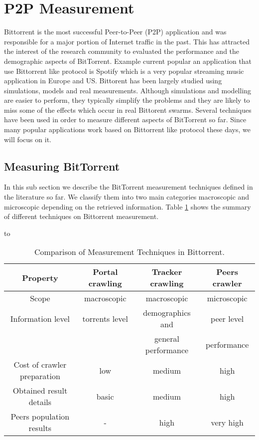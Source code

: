 \section{P2P Measurement}

Bittorrent is the most successful Peer-to-Peer (P2P) application and was responsible for a major portion of Internet traffic in the past.
This has attracted the interest of the research community to evaluated the performance and the demographic aspects of BitTorrent.
Example current popular an application that use Bittorrent like protocol is Spotify which is a very popular streaming music application in Europe and US.
Bittorent has been largely studied using simulations, models and real measurements. 
Although simulations and modelling are easier to perform, they typically simplify the problems and they are likely to miss some of the effects which occur in real Bittorent swarms. 
Several techniques have been used in order to measure different aspects of BitTorrent so far. 
Since many popular applications work based on Bittorrent like protocol these days, we will focus on it.

\subsection{Measuring BitTorrent}
In this sub section we describe the BitTorrent measurement techniques defined in the literature so far. 
We classify them into two main categories macroscopic and microscopic depending on the retrieved information. 
Table \ref{tab:measurementtechniques} shows the summary of different techniques on Bittorrent measurement. 

\begin{table}[thb]
\caption{Comparison of Measurement Techniques in Bittorrent.}
\label{tab:measurementtechniques}
\hbox to\hsize{\hfil}
\begin{tabular}{c|c|c|c}\hline\hline
Property & Portal crawling & Tracker crawling & Peers crawler \\ \hline
Scope & macroscopic & macroscopic & microscopic \\ \hline
Information level & torrents level & demographics and  & peer level \\
 &  & general performance  & performance \\ \hline
Cost of crawler preparation & low & medium & high \\ \hline
Obtained result details & basic & medium & high \\ \hline
Peers population results & - & high & very high \\ \hline
\end{tabular}
\end{table}

